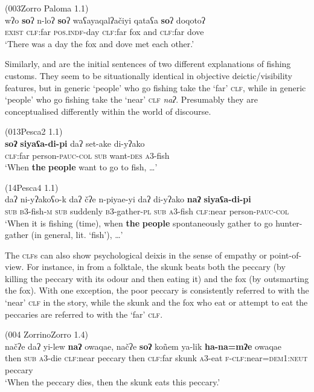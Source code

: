 \documentclass[output=paper,colorlinks,citecolor=brown]{langscibook}
\begin{document}
\ea\label{ex:payne:13} (003Zorro Paloma 1.1)\\
\gll  wʔo  \textbf{so}ʔ  n-loʔ  \textbf{so}ʔ  waʕayaqalʔačiyi  qataʕa  \textbf{so}ʔ  doqotoʔ\\
\textsc{exist}  \textsc{clf}:far  \textsc{pos.indf}-day  \textsc{clf}:far fox and  \textsc{clf}:far  dove\\
\glt ‘There was a day the fox and dove met each other.’ 
\z

Similarly,  and  are the initial sentences of two different explanations of fishing customs. They seem to be situationally identical in objective deictic/visibility features, but in  generic ‘people’ who go fishing take the ‘far’ \textsc{clf}, while in  generic ‘people’ who go fishing take the ‘near’ \textsc{clf} \textit{naʔ}. Presumably they are conceptualised differently within the world of discourse.

\ea\label{ex:payne:14} (013Pesca2 1.1)\\
\gll  \textbf{soʔ}  \textbf{siyaʕa-di-pi}  daʔ  set-ake  di-yʔako\\
\textsc{clf}:far person-\textsc{pauc-col}  \textsc{sub}   want-\textsc{des}  \textsc{a3}-fish\\
\glt ‘When \textbf{the} \textbf{people} want to go to fish, …’ 
\z

\ea\label{ex:payne:15} (14Pesca4 1.1)\\
\gll  daʔ  ni-yʔakoʕo-k  daʔ  čʔe    n-piyae-yi daʔ  di-yʔako  \textbf{naʔ}    \textbf{siyaʕa-di-pi}\\
\textsc{sub}  \textsc{b3}-fish-\textsc{m}  \textsc{sub}  suddenly  \textsc{b3}-gather-\textsc{pl} \textsc{sub}  \textsc{a3}-fish    \textsc{clf}:near person-\textsc{pauc-col}\\
\glt ‘When it is fishing (time), when \textbf{the} \textbf{people} spontaneously gather to go hunter-gather (in general, lit. ‘fish’), …’ 
\z

The \textsc{clf}s can also show psychological deixis in the sense of empathy or point-of-view. For instance, in  from a folktale, the skunk beats both the peccary (by killing the peccary with its odour and then eating it) and the fox (by outsmarting the fox). With one exception, the poor peccary is consistently referred to with the ‘near’ \textsc{clf} in the story, while the skunk and the fox who eat or attempt to eat the peccaries are referred to with the ‘far’ \textsc{clf}.

\ea\label{ex:payne:16} (004 ZorrinoZorro 1.4)\\
\gll  načʔe  daʔ  yi-lew  \textbf{naʔ}  owaqae,  načʔe \textbf{soʔ} koñem ya-lik  \textbf{ha-na=mʔe} owaqae\\
then  \textsc{sub}  \textsc{a3}-die  \textsc{clf}:near  peccary  then \textsc{clf}:far skunk \textsc{a3}-eat  \textsc{f-clf}:near=\textsc{dem1:neut} peccary\\
\glt ‘When the peccary dies, then the skunk eats this peccary.’ 
\z
\end{document}

